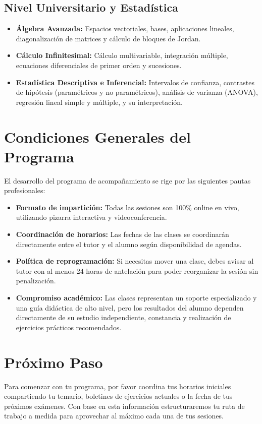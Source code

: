 \documentclass[11pt,a4paper]{article}
\begin{document}
\subsection{Nivel Universitario y Estadística}
\begin{itemize}
    \item \textbf{Álgebra Avanzada:} Espacios vectoriales, bases, aplicaciones lineales, diagonalización de matrices y cálculo de bloques de Jordan.
    \item \textbf{Cálculo Infinitesimal:} Cálculo multivariable, integración múltiple, ecuaciones diferenciales de primer orden y sucesiones.
    \item \textbf{Estadística Descriptiva e Inferencial:} Intervalos de confianza, contrastes de hipótesis (paramétricos y no paramétricos), análisis de varianza (ANOVA), regresión lineal simple y múltiple, y su interpretación.
\end{itemize}

\section{Condiciones Generales del Programa}
El desarrollo del programa de acompañamiento se rige por las siguientes pautas profesionales:
\begin{itemize}
    \item \textbf{Formato de impartición:} Todas las sesiones son 100\% online en vivo, utilizando pizarra interactiva y videoconferencia.
    \item \textbf{Coordinación de horarios:} Las fechas de las clases se coordinarán directamente entre el tutor y el alumno según disponibilidad de agendas.
    \item \textbf{Política de reprogramación:} Si necesitas mover una clase, debes avisar al tutor con al menos 24 horas de antelación para poder reorganizar la sesión sin penalización.
    \item \textbf{Compromiso académico:} Las clases representan un soporte especializado y una guía didáctica de alto nivel, pero los resultados del alumno dependen directamente de su estudio independiente, constancia y realización de ejercicios prácticos recomendados.
\end{itemize}

\section{Próximo Paso}
Para comenzar con tu programa, por favor coordina tus horarios iniciales compartiendo tu temario, boletines de ejercicios actuales o la fecha de tus próximos exámenes. Con base en esta información estructuraremos tu ruta de trabajo a medida para aprovechar al máximo cada una de tus sesiones.
\end{document}

